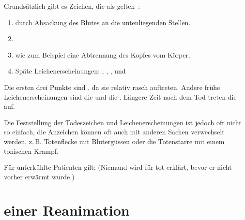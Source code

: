 {%
Grundsätzlich gibt es Zeichen, die als 
gelten~\cite{ForMed2,GrassbergerTodesermittlung1}:

\begin{enumerate}
    \item {} durch
    Absackung des Blutes an die untenliegenden Stellen.
    \item {}
    \item {}
    wie zum Beispiel eine Abtrennung des Kopfes vom Körper.
    \item Späte Leichenerscheinungen: , , , 
und 
\end{enumerate}
Die ersten drei Punkte sind , da sie relativ rasch auftreten.
Andere frühe Leichenerscheinungen sind die  und die . Längere Zeit nach dem Tod
treten die  auf.

Die Feststellung der Todeszeichen und Leichenerscheinungen
ist jedoch oft nicht so einfach, die Anzeichen können oft
auch mit anderen Sachen verwechselt werden, z.\,B.
Totenflecke mit Blutergüssen oder die Totenstarre mit einem
tonischen Krampf.
}{}{}{}{}


\begin{Synopsis}
\end{Synopsis}
\begin{Danger}
  \item Für unterkühlte Patienten gilt: 
  (Niemand wird für tot erklärt, bevor er nicht vorher erwärmt
  wurde.)
\end{Danger}



\section{ einer Reanimation}


